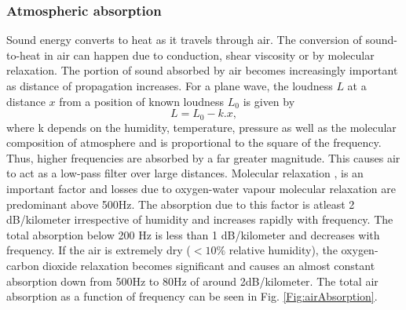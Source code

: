 \subsubsection{Atmospheric absorption}
Sound energy converts to heat as it travels through air. The conversion of sound-to-heat in air can happen due to conduction, shear viscosity or by molecular relaxation. The portion of sound absorbed by air becomes increasingly important as distance of propagation increases. For a plane wave, the loudness $L$ at a distance $x$ from a position of known loudness $L_0$ is given by
\begin{equation}
    L= L_0 - k.x,
\end{equation}
where k depends on the humidity, temperature, pressure as well as the molecular composition of atmosphere and is proportional to the square of the frequency. Thus, higher frequencies are absorbed by a far greater magnitude. This causes air to act as a low-pass filter over large distances. Molecular relaxation \cite{bass1990atmospheric}, \cite{evans1972atmospheric} is an important factor and losses due to oxygen-water vapour molecular relaxation are predominant above 500Hz. The absorption due to this factor is atleast 2 dB/kilometer irrespective of humidity and increases rapidly with frequency. The total absorption below 200 Hz is less than 1 dB/kilometer and decreases with frequency. If the air is extremely dry ($< 10\%$ relative humidity), the oxygen-carbon dioxide relaxation becomes significant and causes an almost constant absorption down from 500Hz to 80Hz of around 2dB/kilometer. The total air absorption as a function of frequency can be seen in Fig. \ref{Fig:airAbsorption}.
